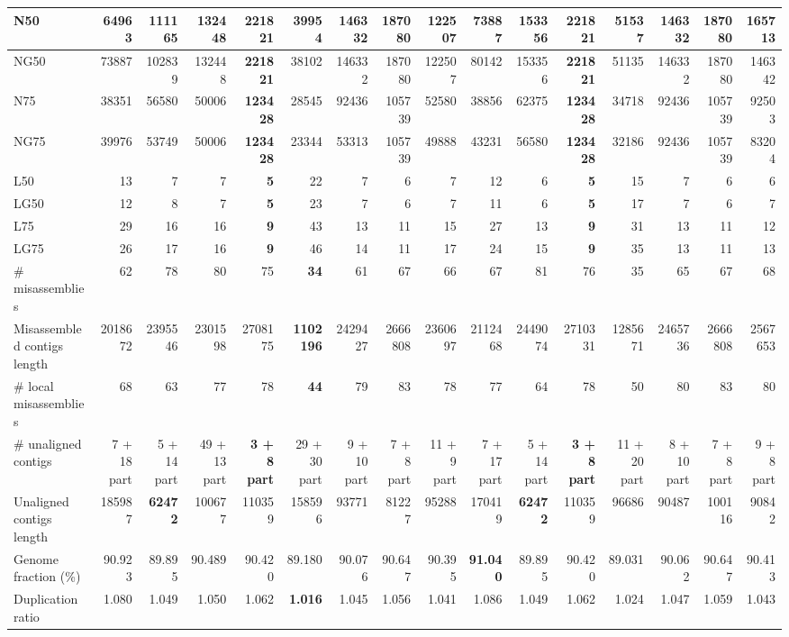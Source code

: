 \documentclass[12pt,a4paper]{article}
\begin{document}
\begin{table}[ht]
\begin{center}
\begin{tabular}{|l*{15}{|r}|}
N50 & 64963 & 111165 & 132448 & {\bf 221821} & 39954 & 146332 & 187080 & 122507 & 73887 & 153356 & {\bf 221821} & 51537 & 146332 & 187080 & 165713 \\ \hline
NG50 & 73887 & 102839 & 132448 & {\bf 221821} & 38102 & 146332 & 187080 & 122507 & 80142 & 153356 & {\bf 221821} & 51135 & 146332 & 187080 & 146342 \\ \hline
N75 & 38351 & 56580 & 50006 & {\bf 123428} & 28545 & 92436 & 105739 & 52580 & 38856 & 62375 & {\bf 123428} & 34718 & 92436 & 105739 & 92503 \\ \hline
NG75 & 39976 & 53749 & 50006 & {\bf 123428} & 23344 & 53313 & 105739 & 49888 & 43231 & 56580 & {\bf 123428} & 32186 & 92436 & 105739 & 83204 \\ \hline
L50 & 13 & 7 & 7 & {\bf 5} & 22 & 7 & 6 & 7 & 12 & 6 & {\bf 5} & 15 & 7 & 6 & 6 \\ \hline
LG50 & 12 & 8 & 7 & {\bf 5} & 23 & 7 & 6 & 7 & 11 & 6 & {\bf 5} & 17 & 7 & 6 & 7 \\ \hline
L75 & 29 & 16 & 16 & {\bf 9} & 43 & 13 & 11 & 15 & 27 & 13 & {\bf 9} & 31 & 13 & 11 & 12 \\ \hline
LG75 & 26 & 17 & 16 & {\bf 9} & 46 & 14 & 11 & 17 & 24 & 15 & {\bf 9} & 35 & 13 & 11 & 13 \\ \hline
\# misassemblies & 62 & 78 & 80 & 75 & {\bf 34} & 61 & 67 & 66 & 67 & 81 & 76 & 35 & 65 & 67 & 68 \\ \hline
Misassembled contigs length & 2018672 & 2395546 & 2301598 & 2708175 & {\bf 1102196} & 2429427 & 2666808 & 2360697 & 2112468 & 2449074 & 2710331 & 1285671 & 2465736 & 2666808 & 2567653 \\ \hline
\# local misassemblies & 68 & 63 & 77 & 78 & {\bf 44} & 79 & 83 & 78 & 77 & 64 & 78 & 50 & 80 & 83 & 80 \\ \hline
\# unaligned contigs & 7 + 18 part & 5 + 14 part & 49 + 13 part & {\bf 3 + 8 part} & 29 + 30 part & 9 + 10 part & 7 + 8 part & 11 + 9 part & 7 + 17 part & 5 + 14 part & {\bf 3 + 8 part} & 11 + 20 part & 8 + 10 part & 7 + 8 part & 9 + 8 part \\ \hline
Unaligned contigs length & 185987 & {\bf 62472} & 100677 & 110359 & 158596 & 93771 & 81227 & 95288 & 170419 & {\bf 62472} & 110359 & 96686 & 90487 & 100116 & 90842 \\ \hline
Genome fraction (\%) & 90.923 & 89.895 & 90.489 & 90.420 & 89.180 & 90.076 & 90.647 & 90.395 & {\bf 91.040} & 89.895 & 90.420 & 89.031 & 90.062 & 90.647 & 90.413 \\ \hline
Duplication ratio & 1.080 & 1.049 & 1.050 & 1.062 & {\bf 1.016} & 1.045 & 1.056 & 1.041 & 1.086 & 1.049 & 1.062 & 1.024 & 1.047 & 1.059 & 1.043 \\ \hline

\end{tabular}
\end{center}
\end{table}
\end{document}
